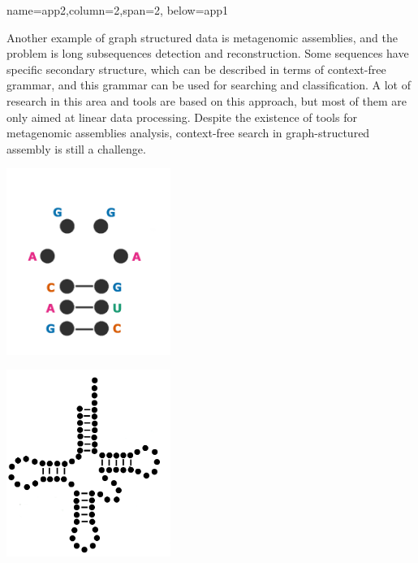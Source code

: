 \documentclass[a0paper,portrait]{baposter}
\begin{document}
\begin{poster}
{name=app2,column=2,span=2, below=app1}
{
Another example of graph structured data is metagenomic assemblies, and the problem is long subsequences detection and reconstruction.
Some sequences have specific secondary structure, which can be described in terms of context-free grammar, and this grammar can be used for searching and classification.
A lot of research in this area and tools are based on this approach, but most of them are only aimed at linear data processing.
Despite the existence of tools for metagenomic assemblies analysis, context-free search in graph-structured assembly is still a challenge.
\begin{center}
\includegraphics[width=0.4\textwidth]{RNA_small.png}
\end{center}
\begin{center}
\includegraphics[width=0.4\textwidth]{tRNA.png}
\end{center}

}




\end{poster}
\end{document}
